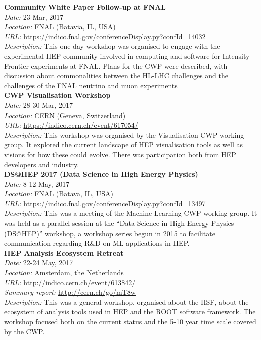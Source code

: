 \documentclass[12pt,a4paper]{article}
\begin{document}
\begin{appendices}
\noindent
\textbf{Community White Paper Follow-up at FNAL}\\
\emph{Date:} 23 Mar, 2017\\
\emph{Location:} FNAL (Batavia, IL, USA)\\
\emph{URL:}
\href{https://indico.fnal.gov/conferenceDisplay.py?confId=14032}{{https://indico.fnal.gov/conferenceDisplay.py?confId=14032}}\\
\emph{Description:} This one-day workshop was organised to engage with
the experimental HEP community involved in computing and software for
Intensity Frontier experiments at FNAL. Plans for the CWP were
described, with discussion about commonalities between the HL-LHC
challenges and the challenges of the FNAL neutrino and muon
experiments\\

\noindent
\textbf{CWP Visualisation Workshop}\\
\emph{Date:} 28-30 Mar, 2017\\
\emph{Location:} CERN (Geneva, Switzerland)\\
\emph{URL:}
\href{https://indico.cern.ch/event/617054/}{{https://indico.cern.ch/event/617054/}}\\
\emph{Description:} This workshop was organised by the Visualisation CWP
working group. It explored the current landscape of HEP visualisation
tools as well as visions for how these could evolve. There was
participation both from HEP developers and industry.\\

\noindent
\textbf{DS@HEP 2017 (Data Science in High Energy Physics)}\\
\emph{Date:} 8-12 May, 2017\\
\emph{Location:} FNAL (Batava, IL, USA)\\
\emph{URL:}
\href{https://indico.fnal.gov/conferenceDisplay.py?confId=13497}{{https://indico.fnal.gov/conferenceDisplay.py?confId=13497}}\\
\emph{Description:} This was a meeting of the Machine Learning CWP
working group. It was held as a parallel session at the ``Data Science
in High Energy Physics (DS@HEP)'' workshop, a workshop series begun in
2015 to facilitate communication regarding R\&D on ML applications in
HEP.\\

\noindent
\textbf{HEP Analysis Ecosystem Retreat}\\
\emph{Date:} 22-24 May, 2017\\
\emph{Location:} Amsterdam, the Netherlands\\
\emph{URL:}
\href{http://indico.cern.ch/event/613842/}{{http://indico.cern.ch/event/613842/}}\\
\emph{Summary report:}
\href{http://hepsoftwarefoundation.org/assets/AnalysisEcosystemReport20170804.pdf}{{http://cern.ch/go/mT8w}}\\
\emph{Description:} This was a general workshop, organised about the
HSF, about the ecosystem of analysis tools used in HEP and the ROOT
software framework. The workshop focused both on the current status and
the 5-10 year time scale covered by the CWP.\\


\end{appendices}
\end{document}
